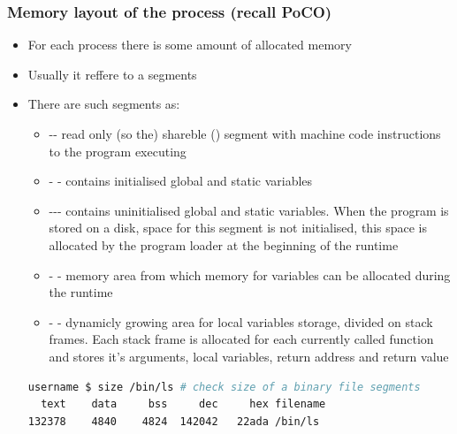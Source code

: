 \documentclass[usenames,dvipsnames,10pt,aspectratio=169]{beamer}
\begin{document}
\begin{frame}[fragile]
    \frametitle{Memory layout of the process (recall PoCO)}
    \begin{itemize}
        \item For each process there is some amount of allocated memory
        \item Usually it reffere to a segments
        \item There are such segments as:
        \begin{itemize}
            \item -- read only (so the) shareble () segment with machine code instructions to the program executing 
            \item - - contains initialised global and static variables
            \item --- contains uninitialised global and static variables. When the program is stored on a disk, space for this segment is not initialised, this space is allocated by the program loader at the beginning of the runtime
            \item - - memory area from which memory for variables can be allocated during the runtime
            \item - - dynamicly growing area for local variables storage, divided on stack frames. Each stack frame is allocated for each currently called function and stores it's arguments, local variables, return address and return value
        \end{itemize}
        \begin{lstlisting}[language=Bash, style=shellstyle] 
username $ size /bin/ls # check size of a binary file segments
  text    data     bss     dec     hex filename
132378    4840    4824  142042   22ada /bin/ls
\end{lstlisting}
    \end{itemize}
\end{frame}
\end{document}
